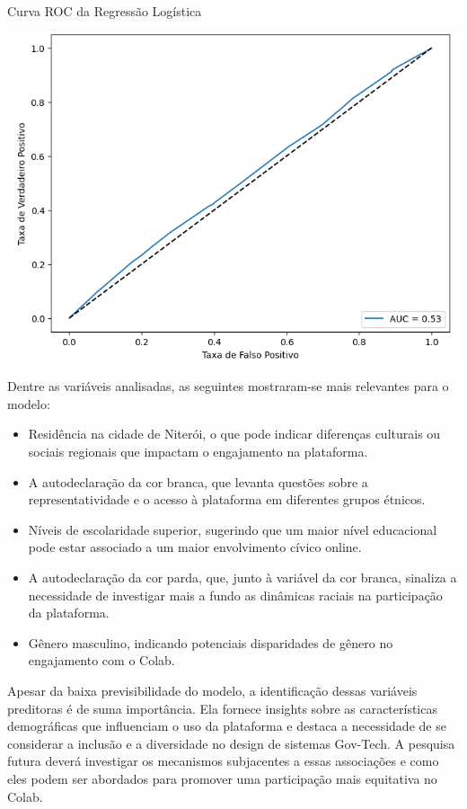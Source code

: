\begin{quadro}[!htb]
	\caption{Curva ROC da Regressão Logística}
	\label{fig:regression_roc}
	\centering
	\includegraphics[scale=0.8]{images/regression_roc.png}
\end{quadro}

Dentre as variáveis analisadas, as seguintes mostraram-se mais relevantes para o modelo:

\begin{itemize}
	\item Residência na cidade de Niterói, o que pode indicar diferenças culturais ou sociais regionais que impactam o engajamento na plataforma.
	\item A autodeclaração da cor branca, que levanta questões sobre a representatividade e o acesso à plataforma em diferentes grupos étnicos.
	\item Níveis de escolaridade superior, sugerindo que um maior nível educacional pode estar associado a um maior envolvimento cívico online.
	\item A autodeclaração da cor parda, que, junto à variável da cor branca, sinaliza a necessidade de investigar mais a fundo as dinâmicas raciais na participação da plataforma.
	\item Gênero masculino, indicando potenciais disparidades de gênero no engajamento com o Colab.
\end{itemize}

Apesar da baixa previsibilidade do modelo, a identificação dessas variáveis preditoras é de suma importância. Ela fornece insights sobre as características demográficas que influenciam o uso da plataforma e destaca a necessidade de se considerar a inclusão e a diversidade no design de sistemas Gov-Tech. A pesquisa futura deverá investigar os mecanismos subjacentes a essas associações e como eles podem ser abordados para promover uma participação mais equitativa no Colab.


